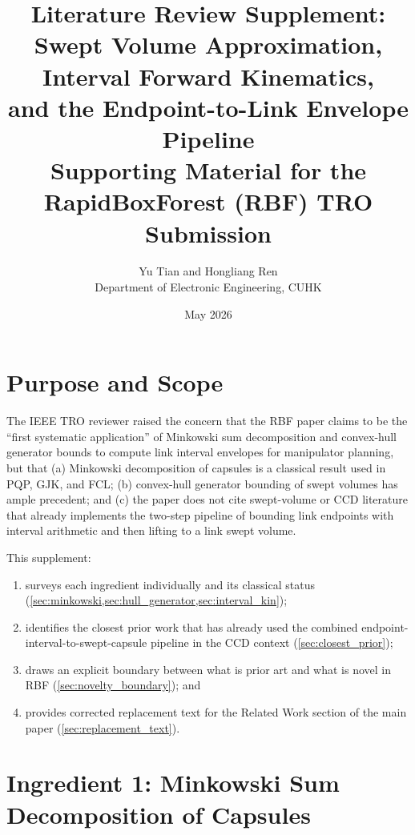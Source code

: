 \documentclass[11pt,a4paper]{article}
\title{%
  Literature Review Supplement:\\
  Swept Volume Approximation, Interval Forward Kinematics,\\
  and the Endpoint-to-Link Envelope Pipeline\\[0.4em]
  \large Supporting Material for the RapidBoxForest (RBF) TRO Submission}
\author{Yu Tian and Hongliang Ren\\
  Department of Electronic Engineering, CUHK}
\date{May 2026}
\begin{document}
\maketitle
\tableofcontents
\bigskip

\section{Purpose and Scope}
\label{sec:purpose}

The IEEE TRO reviewer raised the concern that the RBF paper claims to be the
``first systematic application'' of Minkowski sum decomposition and convex-hull
generator bounds to compute link interval envelopes for manipulator planning,
but that (a) Minkowski decomposition of capsules is a classical result used in
PQP, GJK, and FCL; (b) convex-hull generator bounding of swept volumes has
ample precedent; and (c) the paper does not cite swept-volume or CCD literature
that already implements the two-step pipeline of bounding link endpoints with
interval arithmetic and then lifting to a link swept volume.

This supplement:
\begin{enumerate}[nosep]
  \item surveys each ingredient individually and its classical status
    (\cref{sec:minkowski,sec:hull_generator,sec:interval_kin});
  \item identifies the closest prior work that has already used the combined
    endpoint-interval-to-swept-capsule pipeline in the CCD context
    (\cref{sec:closest_prior});
  \item draws an explicit boundary between what is prior art and what is novel
    in RBF (\cref{sec:novelty_boundary}); and
  \item provides corrected replacement text for the Related Work section of the
    main paper (\cref{sec:replacement_text}).
\end{enumerate}

\section{Ingredient 1: Minkowski Sum Decomposition of Capsules}
\label{sec:minkowski}
\end{document}
